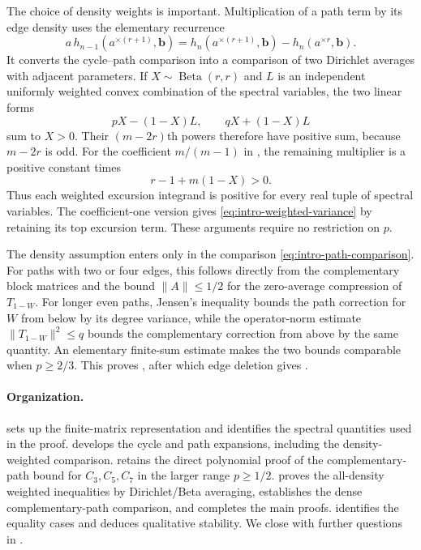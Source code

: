 \documentclass[11pt]{article}
\numberwithin{equation}{section}
\newcommand{\BetaLaw}{\operatorname{Beta}}
\newcommand{\Tker}[1]{T_{#1}}
\begin{document}
The choice of density weights is important. Multiplication of a path
term by its edge density uses the elementary recurrence
\[
  a\,h_{n-1}(a^{\times(r+1)},\boldsymbol b)
  =h_n(a^{\times(r+1)},\boldsymbol b)
   -h_n(a^{\times r},\boldsymbol b).
\]
It converts the cycle--path comparison into a comparison of two
Dirichlet averages with adjacent parameters. If
$X\sim\BetaLaw(r,r)$ and $L$ is an independent uniformly weighted
convex combination of the spectral variables, the two linear forms
\[
  pX-(1-X)L,
  \qquad qX+(1-X)L
\]
sum to $X>0$. Their $(m-2r)$th powers therefore have positive sum,
because $m-2r$ is odd. For the coefficient $m/(m-1)$ in
, the remaining multiplier is a
positive constant times
\[
  r-1+m(1-X)>0.
\]
Thus each weighted excursion integrand is positive for every real
tuple of spectral variables. The coefficient-one version gives
\eqref{eq:intro-weighted-variance} by retaining its top excursion
term. These arguments require no restriction on $p$.

The density assumption enters only in the comparison
\eqref{eq:intro-path-comparison}. For paths with two or four edges,
this follows directly from the complementary block matrices and the
bound $\|A\|\le1/2$ for the zero-average compression of
$\Tker{1-W}$. For longer even paths, Jensen's inequality bounds the
path correction for $W$ from below by its degree variance, while the
operator-norm estimate
$\|\Tker{1-W}\|^2\le q$ bounds the complementary correction from
above by the same quantity. An elementary finite-sum estimate makes
the two bounds comparable when $p\ge2/3$. This proves
, after which edge deletion gives
.

\paragraph{Organization.}
 sets up the finite-matrix representation
and identifies the spectral quantities used in the proof.
 develops the cycle and path expansions, including
the density-weighted comparison.  retains the
direct polynomial proof of the complementary-path bound for
$C_3,C_5,C_7$ in the larger range $p\ge1/2$.
 proves the all-density weighted
inequalities by Dirichlet/Beta averaging, establishes the dense
complementary-path comparison, and completes the main proofs.
 identifies the equality cases and
deduces qualitative stability. We close with further questions in
.
\end{document}
